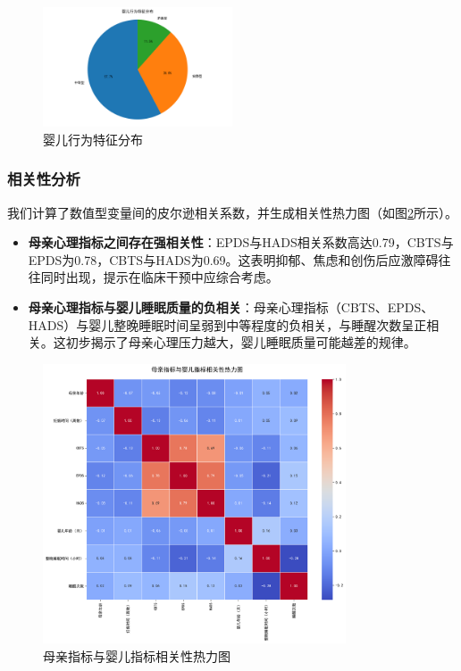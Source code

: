 \documentclass[withoutpreface,bwprint]{cumcmthesis}
\begin{document}
\begin{figure}[htbp]
    \centering
    \includegraphics[width=0.5\textwidth]{figures/baby_behavior_distribution.png}
    \caption{婴儿行为特征分布}
    \label{fig:baby_behavior_distribution}
\end{figure}

\subsubsection{相关性分析}
我们计算了数值型变量间的皮尔逊相关系数，并生成相关性热力图（如图\ref{fig:correlation_heatmap}所示）。
\begin{itemize}
    \item \textbf{母亲心理指标之间存在强相关性}：EPDS与HADS相关系数高达0.79，CBTS与EPDS为0.78，CBTS与HADS为0.69。这表明抑郁、焦虑和创伤后应激障碍往往同时出现，提示在临床干预中应综合考虑。
    \item \textbf{母亲心理指标与婴儿睡眠质量的负相关}：母亲心理指标（CBTS、EPDS、HADS）与婴儿整晚睡眠时间呈弱到中等程度的负相关，与睡醒次数呈正相关。这初步揭示了母亲心理压力越大，婴儿睡眠质量可能越差的规律。
\end{itemize}

\begin{figure}[htbp]
    \centering
    \includegraphics[width=0.8\textwidth]{figures/correlation_heatmap.png}
    \caption{母亲指标与婴儿指标相关性热力图}
    \label{fig:correlation_heatmap}
\end{figure}
\end{document}
